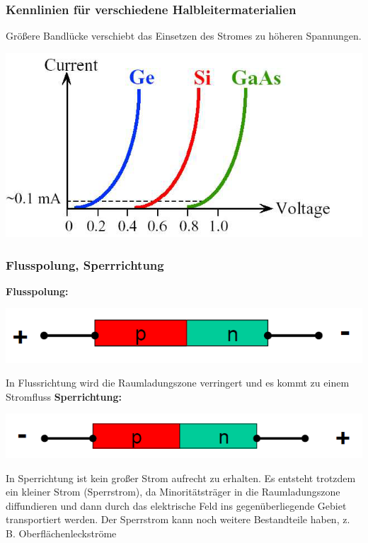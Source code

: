 	\subsubsection{Kennlinien für verschiedene Halbleitermaterialien}
		Größere Bandlücke verschiebt das Einsetzen des Stromes zu höheren Spannungen.
		\begin{center}
			\centering
			\includegraphics[width=0.7\linewidth]{Kapitel/Kap08/DiodeVerschiedeneHLMat.png}	
		\end{center}
	
	
	\subsubsection{Flusspolung, Sperrrichtung}
		\textbf{Flusspolung: }
		\begin{center}
			\includegraphics[width=0.5\linewidth]{Kapitel/Kap08/PNUebergangFlusspolung}
		\end{center}
		In Flussrichtung wird die Raumladungszone verringert und es kommt zu einem Stromfluss
		\newline
		\textbf{Sperrichtung:}
		\begin{center}
			\includegraphics[width=0.5\linewidth]{Kapitel/Kap08/sperrichtung}
		\end{center}
		In Sperrichtung ist kein großer Strom aufrecht zu
		erhalten. Es entsteht trotzdem ein kleiner Strom (Sperrstrom), da Minoritätsträger
		in die Raumladungszone diffundieren und dann
		durch das elektrische Feld ins gegenüberliegende
		Gebiet transportiert werden.
		Der Sperrstrom kann noch weitere Bestandteile haben, z. B. Oberflächenleckströme
		
